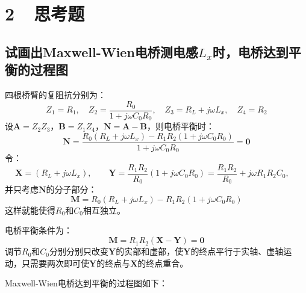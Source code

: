 \documentclass[a4paper,fontset=windows]{ctexart}
\begin{document}
    \section*{2\ \ 思考题}

    \subsection*{试画出Maxwell-Wien电桥测电感$L_x$时，电桥达到平衡的过程图}

    四根桥臂的复阻抗分别为：
    \[
    Z_1 = R_1,\quad Z_2 = \frac{R_0}{1 + j\omega C_0 R_0},\quad Z_3 = R_L + j\omega L_x,\quad Z_4 = R_2
    \]
    设$\bm{A} = Z_2 Z_3$，$\bm{B} = Z_1 Z_4$，$\bm{N} = \bm{A} - \bm{B}$，则电桥平衡时：
    \[
    \bm{N} = \frac{R_0(R_L + j\omega L_x) - R_1 R_2(1 + j\omega C_0 R_0)}{1 + j\omega C_0 R_0} = \bm{0}
    \]
    令：
    \[
    \bm{X} = (R_L + j\omega L_x),\qquad
    \bm{Y} = \frac{R_1 R_2}{R_0}(1 + j\omega C_0 R_0) = \frac{R_1 R_2}{R_0} + j\omega R_1 R_2 C_0,\quad
    \]
    并只考虑$\bm{N}$的分子部分：
    \[
    \bm{M} = R_0(R_L + j\omega L_x) - R_1 R_2(1 + j\omega C_0 R_0)
    \]
    这样就能使得$R_0$和$C_0$相互独立。
    
    电桥平衡条件为：
    \[
    \bm{M} = R_1 R_2(\bm{X}-\bm{Y}) = \bm{0}
    \]
    调节$R_0$和$C_0$分别分别只改变$\bm{Y}$的实部和虚部，使$\bm{Y}$的终点平行于实轴、虚轴运动，只需要两次即可使$\bm{Y}$的终点与$\bm{X}$的终点重合。
    
    Maxwell-Wien电桥达到平衡的过程图如下：
    
    \begin{center}
    \end{center}
\end{document}

